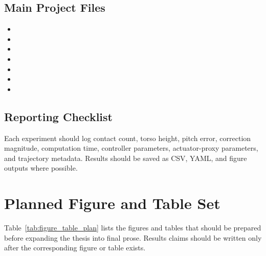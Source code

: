 \documentclass[12pt,a4paper]{report}
\begin{document}
\section{Main Project Files}
\begin{itemize}
    \item {}
    \item {}
    \item {}
    \item {}
    \item {}
    \item {}
    \item {}
\end{itemize}
 
\section{Reporting Checklist}
Each experiment should log contact count, torso height, pitch error, correction magnitude, computation time, controller parameters, actuator-proxy parameters, and trajectory metadata. Results should be saved as CSV, YAML, and figure outputs where possible.
 
\chapter{Planned Figure and Table Set}
 
Table~\ref{tab:figure_table_plan} lists the figures and tables that should be prepared before expanding the thesis into final prose. Results claims should be written only after the corresponding figure or table exists.
 
\end{document}
